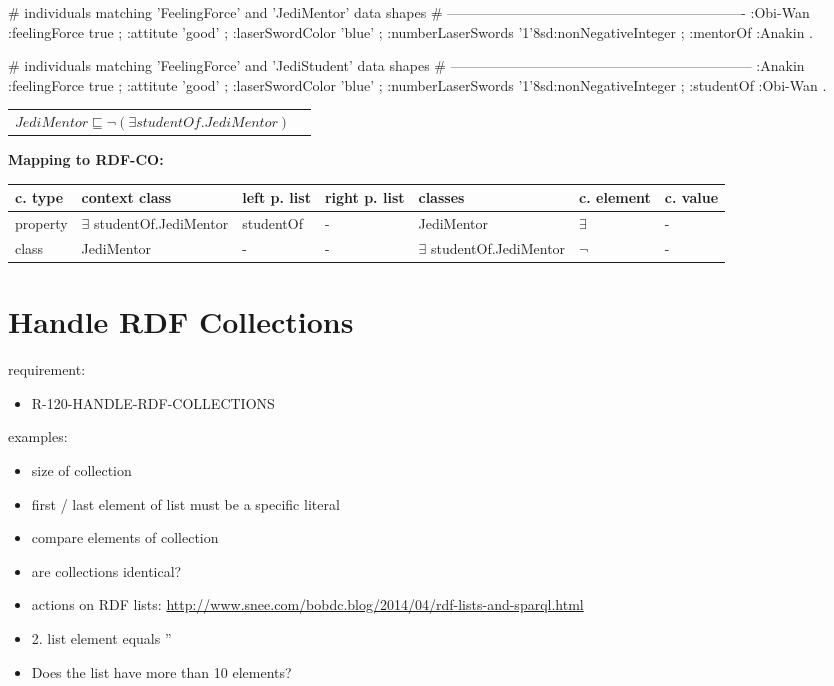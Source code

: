 \documentclass{llncs}
\newenvironment{gcotable}{
  \scriptsize
  \sffamily
  \vspace{0cm}
	\begin{center}
	\textbf{\vspace{0.4cm}Mapping to RDF-CO:} \\
  \begin{tabular}{l|l|l|l|l|l|l}
	\hline
  \textbf{c. type} & \textbf{context class} & \textbf{left p. list} & \textbf{right p. list} & \textbf{classes} & \textbf{c. element} & \textbf{c. value} \\
  \hline

}{
  \hline
  \end{tabular}
	\end{center}
}
\newenvironment{DL}{
  \vspace{0cm}
	\begin{center}
  \begin{tabular}{r l}

}{
  \end{tabular}
	\end{center}
}
\begin{document}
\begin{ex}
# individuals matching 'FeelingForce' and 'JediMentor' data shapes
# ----------------------------------------------------------------
:Obi-Wan 
    :feelingForce true ;
    :attitute 'good' ;
    :laserSwordColor 'blue' ;
    :numberLaserSwords '1'^^xsd:nonNegativeInteger ;
    :mentorOf :Anakin .
\end{ex}

\begin{ex}
# individuals matching 'FeelingForce' and 'JediStudent' data shapes
# -----------------------------------------------------------------
:Anakin 
    :feelingForce true ;
    :attitute 'good' ;
    :laserSwordColor 'blue' ;
    :numberLaserSwords '1'^^xsd:nonNegativeInteger ;
    :studentOf :Obi-Wan .
\end{ex}

\begin{DL}
$JediMentor \sqsubseteq \neg(\exists studentOf.JediMentor)$
\end{DL}

\begin{gcotable}
property & $\exists$ studentOf.JediMentor & studentOf & - & JediMentor & $\exists$ & - \\
class & JediMentor & - & - & $\exists$ studentOf.JediMentor & $\neg$ & - \\
\end{gcotable}

\section{Handle RDF Collections}

requirement:

\begin{itemize}
	\item R-120-HANDLE-RDF-COLLECTIONS
\end{itemize}

examples:

\begin{itemize}
	\item size of collection
	\item first / last element of list must be a specific literal
	\item compare elements of collection
	\item are collections identical?
	\item actions on RDF lists: \url{http://www.snee.com/bobdc.blog/2014/04/rdf-lists-and-sparql.html}
	\item 2. list element equals ''
	\item Does the list have more than 10 elements?
\end{itemize}
\end{document}
